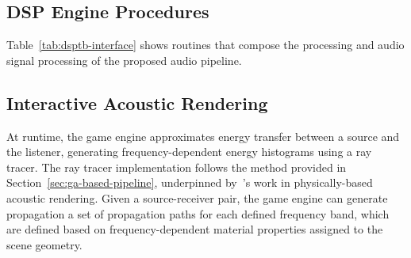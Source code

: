 \subsection{DSP Engine Procedures}
Table~\ref{tab:dsptb-interface} shows routines that compose the processing and audio signal processing of the proposed audio pipeline.




\subsection{Interactive Acoustic Rendering}
At runtime, the game engine approximates energy transfer between a source and the listener, generating frequency-dependent energy histograms using a ray tracer. The ray tracer implementation follows the method provided in Section~\ref{sec:ga-based-pipeline}, underpinned by~\cite{schroder2011physically}'s work in physically-based acoustic rendering.
Given a source-receiver pair, the game engine can generate propagation a set of propagation paths for each defined frequency band, which are defined based on frequency-dependent material properties assigned to the scene geometry.\par

